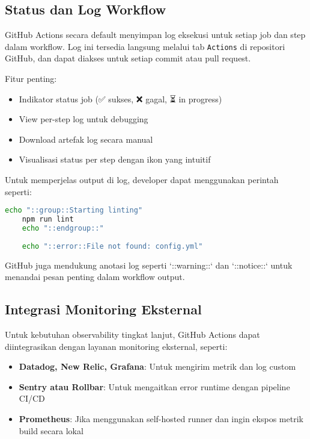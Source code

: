 \subsection{Status dan Log Workflow}

GitHub Actions secara default menyimpan log eksekusi untuk setiap job dan step dalam workflow. Log ini tersedia langsung melalui tab \texttt{Actions} di repositori GitHub, dan dapat diakses untuk setiap commit atau pull request.

Fitur penting:
\begin{itemize}
	\item Indikator status job (✅ sukses, ❌ gagal, ⏳ in progress)
	\item View per-step log untuk debugging
	\item Download artefak log secara manual
	\item Visualisasi status per step dengan ikon yang intuitif
\end{itemize}

Untuk memperjelas output di log, developer dapat menggunakan perintah seperti:

\begin{lstlisting}[language=bash, caption={Contoh Output Terkontrol di Log GitHub Actions}]
	echo "::group::Starting linting"
	npm run lint
	echo "::endgroup::"
	
	echo "::error::File not found: config.yml"
\end{lstlisting}

GitHub juga mendukung anotasi log seperti `::warning::` dan `::notice::` untuk menandai pesan penting dalam workflow output.

\subsection{Integrasi Monitoring Eksternal}

Untuk kebutuhan observability tingkat lanjut, GitHub Actions dapat diintegrasikan dengan layanan monitoring eksternal, seperti:

\begin{itemize}
	\item \textbf{Datadog, New Relic, Grafana}: Untuk mengirim metrik dan log custom
	\item \textbf{Sentry atau Rollbar}: Untuk mengaitkan error runtime dengan pipeline CI/CD
	\item \textbf{Prometheus}: Jika menggunakan self-hosted runner dan ingin ekspos metrik build secara lokal
\end{itemize}

